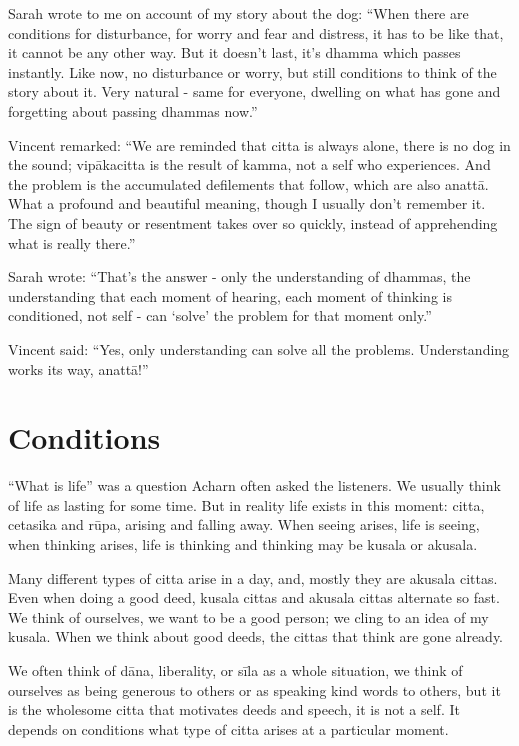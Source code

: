 \documentclass{book}
\begin{document}
Sarah wrote to me on account of my story
about the dog: ``When there are
conditions for disturbance, for worry and fear and distress, it has to
be like that, it cannot be any other way. But it doesn't last, it's
dhamma which passes instantly. Like now, no disturbance or worry, but
still conditions to think of
the story about it. Very natural - same for
everyone, dwelling on what has gone and
forgetting about passing dhammas now.'' 

Vincent remarked:
``We are reminded that citta
is always alone, there is no dog in the sound;
vipākacitta is the
result of kamma, not a self who
experiences. And the problem is the accumulated defilements that follow,
which are also anattā. What
a profound and beautiful meaning, though I usually don't remember it.
The sign of beauty or resentment
takes over so quickly,
instead of apprehending what is really there.''

Sarah wrote:
``That's
the answer - only the understanding of dhammas, the understanding that
each moment of hearing, each moment of thinking is conditioned, not self
- can `solve'
the problem for that moment only.''

Vincent said:
``Yes, only understanding can solve all
the problems. Understanding
works its way,
anattā!''





\section*{Conditions}


``What is life'' was a question Acharn often
asked the listeners. We usually think of life as lasting for some time.
But in reality life exists in this moment: citta, cetasika and rūpa,
arising and falling away. When seeing arises, life is seeing, when
thinking arises, life is thinking and thinking may be kusala or akusala.

Many different types of citta
arise in a day, and, mostly
they are akusala cittas.
Even when doing a good deed, kusala cittas and akusala cittas alternate
so fast. We think of ourselves, we want to be a good person;
we cling to an idea of my kusala. When
we think about good deeds, the cittas that
think are gone already. 

We often
think of dāna, liberality, or sīla as
a whole situation, we think
of ourselves as being generous to others or as speaking kind words to
others, but it is the wholesome citta that motivates deeds and speech,
it is not a self. It depends on conditions what type of citta arises at
a particular moment. 
\end{document}
